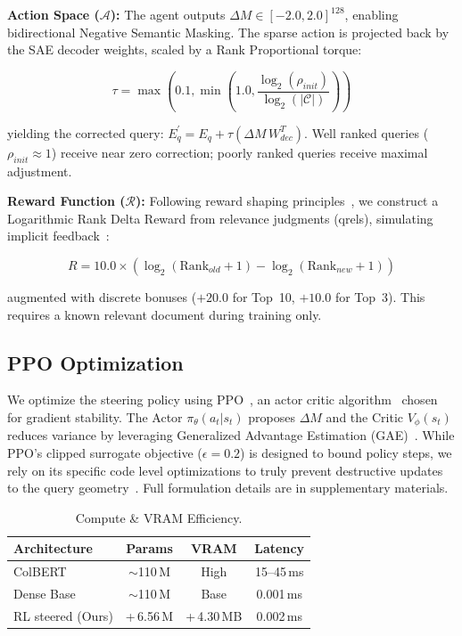 \documentclass[sigconf]{acmart}
\begin{document}
\textbf{Action Space ($\mathcal{A}$):} The agent outputs $\Delta M \in [-2.0, 2.0]^{128}$, enabling bidirectional Negative Semantic Masking. The sparse action is projected back by the SAE decoder weights, scaled by a Rank Proportional torque:

\begin{equation}
\tau = \max\!\left(0.1, \min\!\left(1.0, \frac{\log_2(\rho_{init})}{\log_2(|\mathcal{C}|)}\right)\right)
\end{equation}

yielding the corrected query: $E_q^{\prime} = E_q + \tau (\Delta M \, W_{dec}^T)$. Well ranked queries ($\rho_{init} \approx 1$) receive near zero correction; poorly ranked queries receive maximal adjustment.

\textbf{Reward Function ($\mathcal{R}$):} Following reward shaping principles~\cite{ng1999}, we construct a Logarithmic Rank Delta Reward from relevance judgments (qrels), simulating implicit feedback~\cite{joachims2002}:

\begin{equation}
R = 10.0 \times (\log_2(\text{Rank}_{old} + 1) - \log_2(\text{Rank}_{new} + 1))
\end{equation}

augmented with discrete bonuses ($+20.0$ for Top~10, $+10.0$ for Top~3). This requires a known relevant document during training only.

\subsection{PPO Optimization}

We optimize the steering policy using PPO~\cite{schulman2017}, an actor critic algorithm~\cite{konda1999} chosen for gradient stability. The Actor $\pi_\theta(a_t|s_t)$ proposes $\Delta M$ and the Critic $V_\phi(s_t)$ reduces variance by leveraging Generalized Advantage Estimation (GAE)~\cite{schulman2016}. While PPO's clipped surrogate objective ($\epsilon = 0.2$) is designed to bound policy steps, we rely on its specific code level optimizations to truly prevent destructive updates to the query geometry~\cite{engstrom2020}. Full formulation details are in supplementary materials.

\begin{table}[t]
  \caption{Compute \& VRAM Efficiency.}
  \label{tab:compute}
  \begin{tabular}{lccc}
    \toprule
    Architecture & Params & VRAM & Latency\\
    \midrule
    ColBERT & $\sim$110\,M & High & 15--45\,ms\\
    Dense Base & $\sim$110\,M & Base & 0.001\,ms\\
    RL steered (Ours) & +\,6.56\,M & +\,4.30\,MB & 0.002\,ms\\
    \bottomrule
  \end{tabular}
\end{table}
\end{document}
